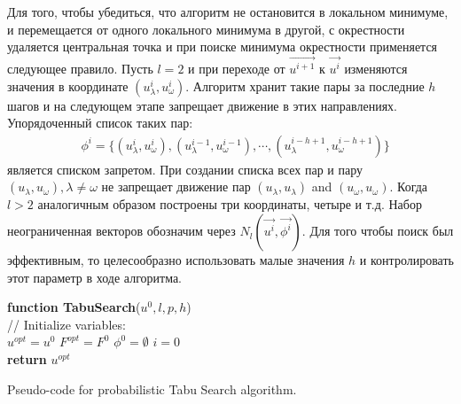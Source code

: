 \documentclass[]{TAACpaper}
\begin{document}
Для того, чтобы убедиться, что алгоритм не остановится в локальном минимуме, и перемещается от одного локального минимума в другой, с окрестности удаляется центральная точка и при поиске минимума окрестности применяется следующее правило. Пусть $l=2$ и при переходе от $\vec{u^{i+1}}$ к $\vec{u^i}$ изменяются значения в координате $(u_\lambda^{i}, u_\omega^{i})$. Алгоритм хранит такие пары за последние $h$ шагов и на следующем этапе запрещает движение в этих направлениях. Упорядоченный список таких пар:
\begin{align} 
& \phi^i=\{(u_\lambda^{i},u_\omega^{i}),(u_\lambda^{i-1},u_\omega^{i-1}),\cdots,(u_\lambda^{i-h+1},u_\omega^{i-h+1}) \} 
\end{align}	
является списком запретом. При создании списка всех пар  и пару $(u_\lambda,u_\omega),\lambda \ne \omega$ не запрещает движение пар $(u_\lambda,u_\lambda)$ and $(u_\omega,u_\omega)$. Когда $l>2$ аналогичным образом построены три координаты, четыре и т.д. Набор неограниченная векторов обозначим через $N_l(\vec{u^i},\vec{\phi^i})$. Для того чтобы поиск был эффективным, то целесообразно использовать малые значения  $h$ и контролировать этот параметр в ходе алгоритма.

\begin{algorithm}[H]
	\textbf{function TabuSearch}($u^0,l,p,h$) \\
	// Initialize variables:	\\
	$u^{opt} = u^0$
	$F^{opt} = F^0$
	$\phi^{0} =  \emptyset$
	$i=0$ \\
	\textbf{return} $u^{opt}$
	
\caption{Pseudo-code for probabilistic Tabu Search algorithm.}
\label{alg:TabuSearch}
\end{algorithm}
\end{document}
